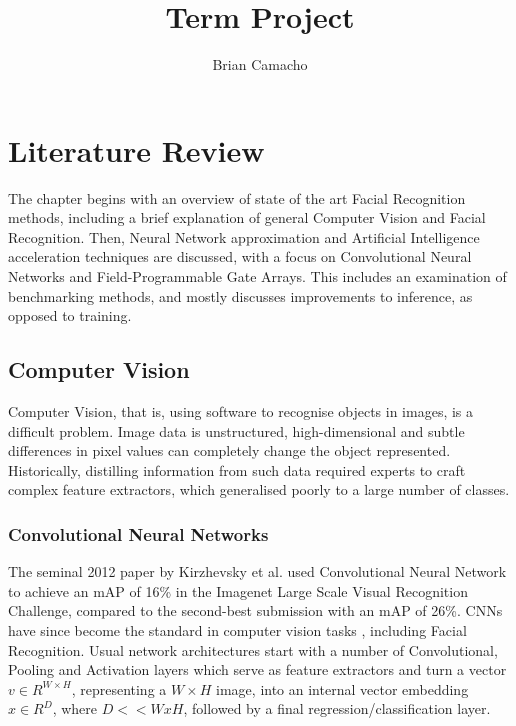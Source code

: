 \documentclass[12pt]{article}
\title{Term Project}
\author{Brian Camacho}
\begin{document}
\maketitle

\newpage
{}

\section{Literature Review}
The chapter begins with an overview of state of the art Facial Recognition methods, including
a brief explanation of general Computer Vision and Facial Recognition.
Then, Neural Network approximation and Artificial Intelligence acceleration techniques are
discussed, with a focus on Convolutional Neural Networks and Field-Programmable Gate Arrays. This
includes an  examination of benchmarking methods, and mostly discusses improvements to inference,
as opposed to training.

\subsection{Computer Vision}
Computer Vision, that is, using software to recognise objects in images, is a difficult
problem. Image data is unstructured, high-dimensional and subtle differences in pixel values
can completely change the object represented\cite{prince2012computer}.
Historically, distilling information from such data required experts to craft complex feature
extractors, which generalised poorly to a large number of classes.

\subsubsection{Convolutional Neural Networks}
The seminal 2012 paper by Kirzhevsky et al. used Convolutional Neural Network to achieve an mAP
of 16\% in the Imagenet Large Scale Visual Recognition Challenge, compared to the second-best
submission with an mAP of 26\%\cite{ILSVRC15}.
CNNs have since become the standard in computer vision tasks \cite{sze2017efficient}, including
Facial Recognition.
Usual network architectures start with a number of Convolutional, Pooling and Activation layers
which serve as feature extractors and turn a vector $v \in R^{W\times H}$, representing a
$W\times H$ image, into an internal vector embedding $x \in R^D$, where $D << WxH$, followed
by a final regression/classification layer.
\end{document}
